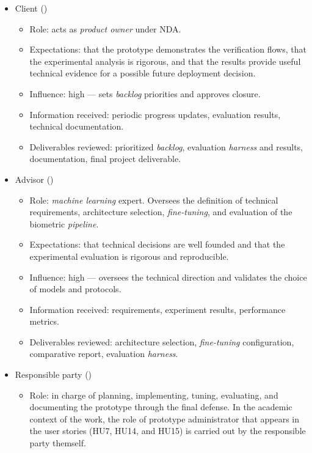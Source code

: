 \documentclass[
  11pt, %
]{charter}
\begin{document}
\begin{itemize}
  \item Client (\clientename)
    \begin{itemize}
      \item Role: acts as \textit{product owner} under NDA.
      \item Expectations: that the prototype demonstrates the verification flows, that the experimental analysis is rigorous, and that the results provide useful technical evidence for a possible future deployment decision.
      \item Influence: high --- sets \textit{backlog} priorities and approves closure.
      \item Information received: periodic progress updates, evaluation results, technical documentation.
      \item Deliverables reviewed: prioritized \textit{backlog}, evaluation \textit{harness} and results, documentation, final project deliverable.
    \end{itemize}
  \item Advisor (\supname)
    \begin{itemize}
      \item Role: \textit{machine learning} expert. Oversees the definition of technical requirements, architecture selection, \textit{fine-tuning}, and evaluation of the biometric \textit{pipeline}.
      \item Expectations: that technical decisions are well founded and that the experimental evaluation is rigorous and reproducible.
      \item Influence: high --- oversees the technical direction and validates the choice of models and protocols.
      \item Information received: requirements, experiment results, performance metrics.
      \item Deliverables reviewed: architecture selection, \textit{fine-tuning} configuration, comparative report, evaluation \textit{harness}.
    \end{itemize}
  \item Responsible party (\authorname)
    \begin{itemize}
      \item Role: in charge of planning, implementing, tuning, evaluating, and documenting the prototype through the final defense. In the academic context of the work, the role of prototype administrator that appears in the user stories (HU7, HU14, and HU15) is carried out by the responsible party themself.

\end{itemize}
\end{itemize}
\end{document}
